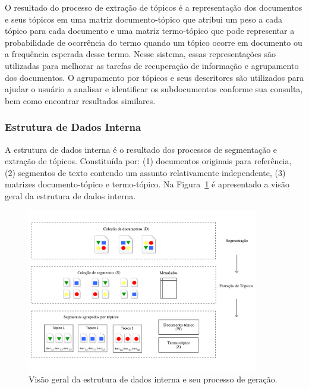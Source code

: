 O resultado do processo de extração de tópicos é a representação dos documentos e seus tópicos em uma matriz documento-tópico que atribui um peso a cada tópico para cada documento e uma matriz termo-tópico que pode representar a probabilidade de ocorrência do termo quando um tópico ocorre em documento ou a frequência esperada desse termo.  
Nesse sistema, essas representações são utilizadas para melhorar as tarefas de recuperação de informação e agrupamento dos documentos. 
O agrupamento por tópicos e seus descritores são utilizados para ajudar o usuário a analisar e identificar os subdocumentos conforme sua consulta, bem como encontrar resultados similares.








\subsubsection{Estrutura de Dados Interna}

A estrutura de dados interna é o resultado dos processos de segmentação e extração de tópicos. Constituída por: 
(1) documentos originais para referência, 
(2) segmentos de texto contendo um assunto relativamente independente,
(3) matrizes documento-tópico e termo-tópico.
Na Figura~\ref{fig:estrutura-dados-interna} é apresentado a visão geral da estrutura de dados interna. 





	\begin{figure}[h!]
\center
		\includegraphics[trim={ 0 40 0 40 },clip,page=1,width=0.9\textwidth]{conteudo/capitulos/figs/estrutura-de-dados-interna.pdf}

		\caption{Visão geral da estrutura de dados interna e seu processo de geração.}
		\label{fig:estrutura-dados-interna}
	\end{figure}



